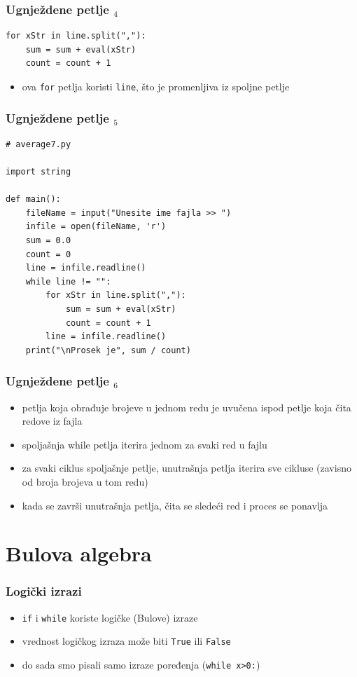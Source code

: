 \documentclass[utf8,compress]{beamer}
\begin{document}
\begin{frame}[fragile]
  \frametitle{Ugnježdene petlje $_4$}
\begin{verbatim}
for xStr in line.split(","):
    sum = sum + eval(xStr)
    count = count + 1
\end{verbatim}
  \begin{itemize}
    \item ova \texttt{for} petlja koristi \texttt{line}, što je promenljiva iz spoljne petlje
  \end{itemize}
\end{frame}

\begin{frame}[fragile,shrink=5]
  \frametitle{Ugnježdene petlje $_5$}
\begin{verbatim}
# average7.py

import string

def main():
    fileName = input("Unesite ime fajla >> ")
    infile = open(fileName, 'r')
    sum = 0.0
    count = 0
    line = infile.readline()
    while line != "":
        for xStr in line.split(","):
            sum = sum + eval(xStr)
            count = count + 1
        line = infile.readline()
    print("\nProsek je", sum / count)

\end{verbatim}
\end{frame}

\begin{frame}[fragile]
  \frametitle{Ugnježdene petlje $_6$}
  \begin{itemize}
    \item petlja koja obrađuje brojeve u jednom redu je uvučena ispod petlje koja čita redove iz fajla
    \item spoljašnja while petlja iterira jednom za svaki red u fajlu
    \item za svaki ciklus spoljašnje petlje, unutrašnja petlja iterira sve cikluse (zavisno od broja brojeva u tom redu)
    \item kada se završi unutrašnja petlja, čita se sledeći red i proces se ponavlja
  \end{itemize}
\end{frame}

\section{Bulova algebra}

\begin{frame}[fragile]
  \frametitle{Logički izrazi}
  \begin{itemize}
    \item \texttt{if} i \texttt{while} koriste logičke (Bulove) izraze
    \item vrednost logičkog izraza može biti \texttt{True} ili \texttt{False}
    \item do sada smo pisali samo izraze poređenja (\texttt{while x>0:})
  \end{itemize}
\end{frame}
\end{document}
